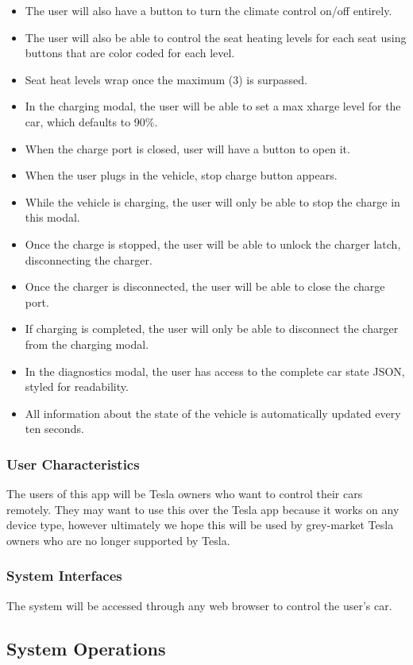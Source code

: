 \documentclass[onecolumn, draftclsnofoot,10pt, compsoc]{IEEEtran}
\begin{document}
\begin{itemize}
    \item The user will also have a button to turn the climate control on/off entirely.
    \item The user will also be able to control the seat heating levels for each seat using buttons that are color coded for each level.
    \item Seat heat levels wrap once the maximum (3) is surpassed.
    \item In the charging modal, the user will be able to set a max xharge level for the car, which defaults to 90\%.
    \item When the charge port is closed, user will have a button to open it.
    \item When the user plugs in the vehicle, stop charge button appears.
    \item While the vehicle is charging, the user will only be able to stop the charge in this modal.
    \item Once the charge is stopped, the user will be able to unlock the charger latch, disconnecting the charger.
    \item Once the charger is disconnected, the user will be able to close the charge port.
    \item If charging is completed, the user will only be able to disconnect the charger from the charging modal.
    \item In the diagnostics modal, the user has access to the complete car state JSON, styled for readability.
    \item All information about the state of the vehicle is automatically updated every ten seconds.
\end{itemize}
\subsubsection{User Characteristics}
The users of this app will be Tesla owners who want to control their cars remotely. They may want to use this over the Tesla app because it works on any device type, however ultimately we hope this will be used by grey-market Tesla owners who are no longer supported by Tesla.
\subsubsection{System Interfaces}
The system will be accessed through any web browser to control the user's car.
\subsection{System Operations}
\end{document}
